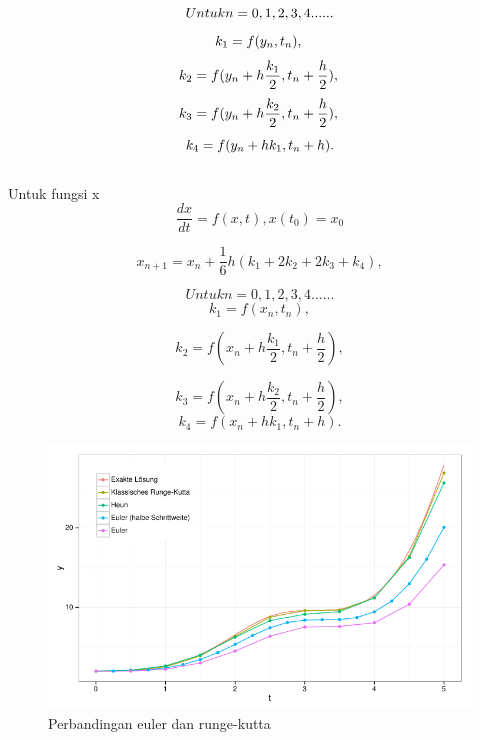 \begin{equation}
Untuk n = 0,1,2,3,4 ......\\
\end{equation}
\begin{equation}
k_1 = f(y_{n} ,t_{n}),\\
\end{equation}
\begin{equation}
k_2 = f(y_{n}+h\dfrac{k_1}{2} ,t_{n}+\dfrac{h}{2}),\\
\end{equation}
\begin{equation}
k_3 = f(y_{n}+h\dfrac{k_2}{2} ,t_{n}+\dfrac{h}{2}),\\
\end{equation}
\begin{equation}
k_4 = f(y_{n}+hk_{1} ,t_{n}+h).\\
\end{equation}
\\
Untuk fungsi x
\begin{equation}
\dfrac{dx}{dt} =f(x,t) , x(t_0)=x_0
\end{equation}

\begin{equation}
x_{n+1} = x_{n} + \dfrac{1}{6}h (k_1+2k_2+2k_3+k_4),
\end{equation}

\begin{equation}
Untuk n = 0,1,2,3,4 ......
\end{equation}
\begin{equation}
k_1 = f(x_{n} ,t_{n}),
\end{equation}

\begin{equation}
k_2 = f(x_{n}+h\dfrac{k_1}{2} ,t_{n}+\dfrac{h}{2}),
\end{equation}

\begin{equation}
k_3 = f(x_{n}+h\dfrac{k_2}{2} ,t_{n}+\dfrac{h}{2}),
\end{equation}
\begin{equation}
k_4 = f(x_{n}+hk_{1} ,t_{n}+h).
\end{equation}


\begin{figure}

\centering
\includegraphics[scale=0.5]{gambar/comparison_euler}
\caption{Perbandingan euler dan runge-kutta}
\end{figure}

